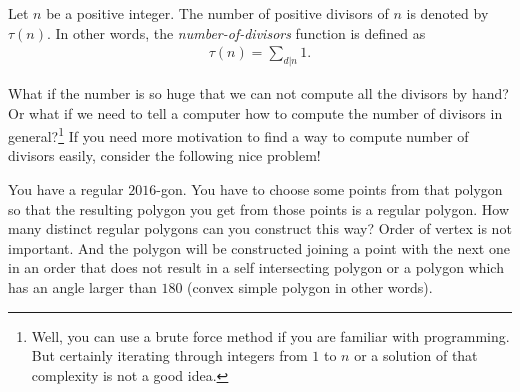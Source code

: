 \documentclass[12pt]{subfile}
\begin{document}
			\begin{definition}
				Let $n$ be a positive integer. The number of positive divisors of $n$ is denoted by $\tau(n)$. In other words, the \textit{number-of-divisors} function is defined as
					\begin{align*}
						\tau(n)=\sum_{d|n} 1.
					\end{align*}
			\end{definition}
		What if the number is so huge that we can not compute all the divisors by hand? Or what if we need to tell a computer how to compute the number of divisors in general?\footnote{Well, you can use a brute force method if you are familiar with programming. But certainly iterating through integers from $1$ to $n$ or a solution of that complexity is not a good idea.} If you need more motivation to find a way to compute number of divisors easily, consider the following nice problem!
			\begin{problem}
				You have a regular $2016$-gon. You have to choose some points from that polygon so that the resulting polygon you get from those points is a regular polygon. How many distinct regular polygons can you construct this way? Order of vertex is not important. And the polygon will be constructed joining a point with the next one in an order that does not result in a self intersecting polygon or a polygon which has an angle larger than $180$ (convex simple polygon in other words).
			\end{problem}
			
\end{document}

